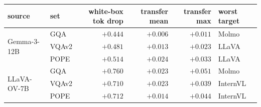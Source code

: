 \footnotesize
\setlength{\tabcolsep}{6pt}
\begin{tabular}{@{}llrrrl@{}}
\toprule
source & set & white-box tok drop & transfer mean & transfer max & worst target \\
\midrule
\multirow{3}{*}{Gemma-3-12B} & GQA & $+0.444$ & $+0.006$ & $+0.011$ & Molmo \\
 & VQAv2 & $+0.481$ & $+0.013$ & $+0.023$ & LLaVA \\
 & POPE & $+0.514$ & $+0.024$ & $+0.033$ & LLaVA \\
\midrule
\multirow{3}{*}{LLaVA-OV-7B} & GQA & $+0.760$ & $+0.023$ & $+0.051$ & Molmo \\
 & VQAv2 & $+0.710$ & $+0.023$ & $+0.039$ & InternVL \\
 & POPE & $+0.712$ & $+0.014$ & $+0.044$ & InternVL \\
\bottomrule
\end{tabular}

\vspace{3pt}
